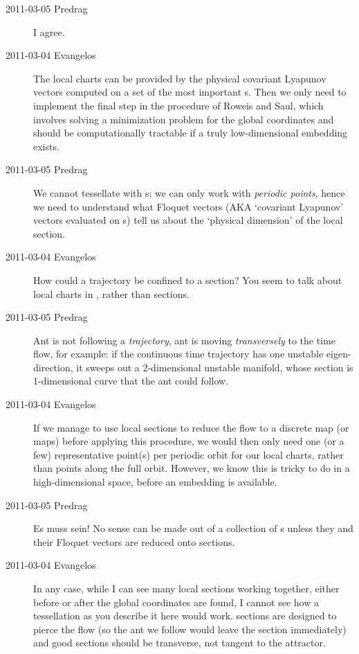 \begin{description}
\item[2011-03-05 Predrag]
I agree.


\item[2011-03-04 Evangelos]
The local charts can be provided by the physical covariant Lyapunov
vectors computed on a set of the most important \po s. Then we only need
to implement the final step in the procedure of Roweis and
Saul, which involves solving a minimization problem for the
global coordinates and should be computationally tractable if a truly
low-dimensional embedding exists.

\item[2011-03-05 Predrag]
We cannot tessellate with \po s; we can only work with \emph{periodic
points}, hence we need to understand what Floquet vectors (AKA `covariant
Lyapunov' vectors evaluated on \po s) tell us about the `physical
dimension' of the local \Poincare section.

\item[2011-03-04 Evangelos]
How could a trajectory be confined to a \Poincare section? You seem
to talk about local charts in , rather than \Poincare sections.

\item[2011-03-05 Predrag]
Ant is not following a \emph{trajectory}, ant is moving \emph{transversely}
to the time flow, for example: if the continuous time trajectory has one
unstable eigen-direction, it sweeps out a 2-dimensional unstable manifold,
whose \Poincare section is 1-dimensional curve that the ant could follow.

\item[2011-03-04 Evangelos]
If we manage to use local \Poincare sections to reduce the flow to a
discrete map (or maps) before applying this procedure, we would then only
need one (or a few) representative point(s) per periodic orbit for our
local charts, rather than points along the full orbit. However, we know
this is tricky to do in a high-dimensional space, before an embedding is
available.

\item[2011-03-05 Predrag]
{Es muss sein!} No sense can be made out of a collection of \po s unless
they and their Floquet vectors are reduced onto  \Poincare sections.

\item[2011-03-04 Evangelos]
In any case, while I can see many local \Poincare sections working
together, either before or after the global coordinates are found, I
cannot see how a tessellation as you describe it here would work.
\Poincare sections are designed to pierce the flow (so the ant we follow
would leave the section immediately) and good sections should be
transverse, not tangent to the attractor.


\end{description}
